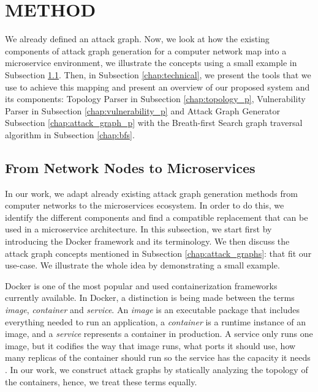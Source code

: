 \section{METHOD}
\label{chap:method}
We already defined an attack graph. Now, we look at how the existing components of attack graph generation for a computer network map into a microservice environment, we illustrate the concepts using a small example in Subsection \ref{chap:mapping}. Then, in Subsection \ref{chap:technical}, we present the tools that we use to achieve this mapping and present an overview of our proposed system and its components: Topology Parser in Subsection \ref{chap:topology_p}, Vulnerability Parser in Subsection \ref{chap:vulnerability_p} and Attack Graph Generator Subsection \ref{chap:attack_graph_p} with the Breath-first Search graph traversal algorithm in Subsection \ref{chap:bfs}. 


\subsection{From Network Nodes to Microservices}
\label{chap:mapping}
In our work, we adapt already existing attack graph generation methods from computer networks to the microservices ecosystem. In order to do this, we identify the different components and find a compatible replacement that can be used in a microservice architecture. In this subsection, we start first by introducing the Docker framework and its terminology. We then discuss the attack graph concepts mentioned in Subsection \ref{chap:attack_graphs}:  that fit our use-case. We illustrate the whole idea  by demonstrating a small example.

Docker is one of the most popular and used containerization frameworks currently available. In Docker, a distinction is being made between the terms \textit{image}, \textit{container} and \textit{service}. An \textit{image} is an executable package that includes everything needed to run an application, a \textit{container} is a runtime instance of an image, and a \textit{service} represents a container in production. A service only runs one image, but it codifies the way that image runs, what ports it should use, how many replicas of the container should run so the service has the capacity it needs \cite{merkel2014docker}. In our work, we construct attack graphs by statically analyzing the topology of the containers, hence, we treat these terms equally.  


